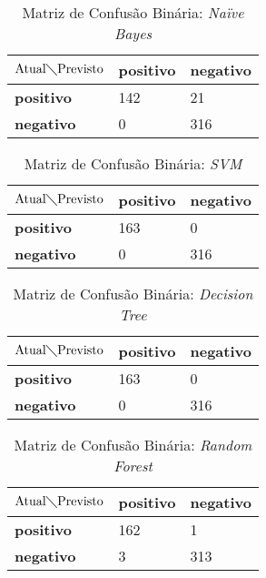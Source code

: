 \begin{table}[h!]
\centering
\caption{Matriz de Confusão Binária: \textit{Naïve Bayes}}
\label{tab:mcb-nb}
\begin{tabular}{|l|l|l|}
\hline
$\textrm{Atual}\diagdown\textrm{Previsto}$ & \textbf{positivo} & \textbf{negativo} \\ \hline
\textbf{positivo}     & 142                 & 21   \\ \hline
\textbf{negativo}     & 0                   & 316 \\ \hline
\end{tabular}
\end{table}

\begin{table}[h!]
\centering
\caption{Matriz de Confusão Binária: \textit{SVM}}
\label{tab:mcb-svm}
\begin{tabular}{|l|l|l|}
\hline
$\textrm{Atual}\diagdown\textrm{Previsto}$ & \textbf{positivo} & \textbf{negativo} \\ \hline
\textbf{positivo}     & 163                 & 0   \\ \hline
\textbf{negativo}     & 0                   & 316 \\ \hline
\end{tabular}
\end{table}

\begin{table}[h!]
\centering
\caption{Matriz de Confusão Binária: \textit{Decision Tree}}
\label{tab:mcb-dt}
\begin{tabular}{|l|l|l|}
\hline
$\textrm{Atual}\diagdown\textrm{Previsto}$ & \textbf{positivo} & \textbf{negativo} \\ \hline
\textbf{positivo}     & 163                 & 0   \\ \hline
\textbf{negativo}     & 0                   & 316 \\ \hline
\end{tabular}
\end{table}

\begin{table}[h!]
\centering
\caption{Matriz de Confusão Binária: \textit{Random Forest}}
\label{tab:mcb-rf}
\begin{tabular}{|l|l|l|}
\hline
$\textrm{Atual}\diagdown\textrm{Previsto}$ & \textbf{positivo} & \textbf{negativo} \\ \hline
\textbf{positivo}     & 162                 & 1   \\ \hline
\textbf{negativo}     & 3                   & 313 \\ \hline
\end{tabular}
\end{table}

